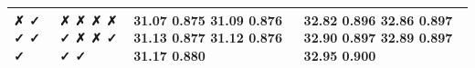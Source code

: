 \begin{tabular}{llll}
\toprule
✗ ✓ ✓ ✓ ✓ & ✗ ✗ ✗ ✗ ✓ ✗ ✗ ✓ ✓ ✓ & 31.07 0.875 31.09 0.876 31.13 0.877 31.12 0.876 31.17 0.880 & 32.82 0.896 32.86 0.897 32.90 0.897 32.89 0.897 32.95 0.900 \\
\midrule
\bottomrule
\end{tabular}
